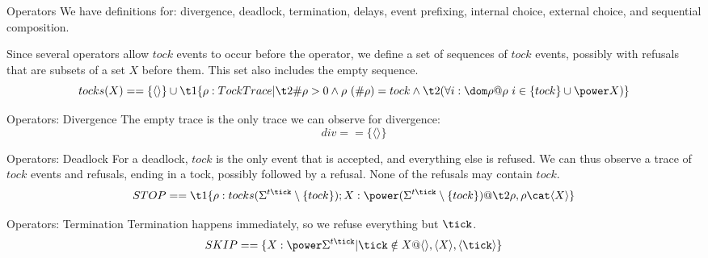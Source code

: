 \documentclass[fleqn]{beamer}
\newenvironment{slide-nocite}[1]
{\begin{frame}[fragile,environment=slide-nocite]
\frametitle{#1}\begin{refsegment}}
{\end{refsegment}\end{frame}}%
\begin{document}
\begin{slide-nocite}{Operators}
  We have definitions for: divergence, deadlock, termination, delays,
  event prefixing, internal choice, external choice, and sequential
  composition.

  \vfill

  Since several operators allow $tock$ events to occur before the
  operator, we define a set of sequences of $tock$ events, possibly
  with refusals that are subsets of a set $X$ before them.
  This set also includes the empty sequence.
  \begin{displaymath}
    tocks(X) == \{\langle\rangle\} \cup {} \\
    \t1 \{ \rho : TockTrace | \\
    \t2 \# \rho > 0 \land \rho~(\# \rho) = tock \land \\
    \t2 (\forall i : \dom \rho @ \rho~i \in \{tock\} \cup \power X) \}
  \end{displaymath}
\end{slide-nocite}

\begin{slide-nocite}{Operators: Divergence}
  The empty trace is the only trace we can observe for divergence:
  \begin{displaymath}
    div == \{\langle\rangle\}    
  \end{displaymath}
\end{slide-nocite}

\begin{slide-nocite}{Operators: Deadlock}
  For a deadlock, $tock$ is the only event that is accepted, and
  everything else is refused. 
  We can thus observe a trace of $tock$ events and refusals, ending in
  a tock, possibly followed by a refusal. 
  None of the refusals may contain $tock$.
  \begin{displaymath}
    STOP == \\
    \t1 \{ \rho : tocks(\Sigma^{t\tick} \setminus \{tock\}); X : \power (\Sigma^{t\tick} \setminus \{tock\}) @ \\
    \t2 \rho, \rho \cat \langle X \rangle \}
  \end{displaymath}
\end{slide-nocite}

\begin{slide-nocite}{Operators: Termination}
  Termination happens immediately, so we refuse everything but $\tick$.
  \begin{displaymath}
    SKIP == \{X : \power \Sigma^{t\tick} | \tick \notin X @ \langle\rangle, \langle X \rangle, \langle \tick \rangle \}
  \end{displaymath}
\end{slide-nocite}
\end{document}
